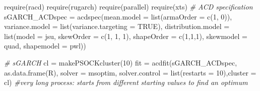 \documentclass[a4paper, twoside]{templates/ociamthesis}
\newenvironment{Shaded}{\begin{snugshade}}{\end{snugshade}}
\newcommand{\AttributeTok}[1]{\textcolor[rgb]{0.77,0.63,0.00}{#1}}
\newcommand{\CommentTok}[1]{\textcolor[rgb]{0.56,0.35,0.01}{\textit{#1}}}
\newcommand{\ConstantTok}[1]{\textcolor[rgb]{0.00,0.00,0.00}{#1}}
\newcommand{\DecValTok}[1]{\textcolor[rgb]{0.00,0.00,0.81}{#1}}
\newcommand{\FunctionTok}[1]{\textcolor[rgb]{0.00,0.00,0.00}{#1}}
\newcommand{\NormalTok}[1]{#1}
\newcommand{\OtherTok}[1]{\textcolor[rgb]{0.56,0.35,0.01}{#1}}
\newcommand{\StringTok}[1]{\textcolor[rgb]{0.31,0.60,0.02}{#1}}
\renewenvironment{Shaded}
{
  \vspace{10pt}%
  \begin{snugshade}%
}{%
  \end{snugshade}%
  \vspace{8pt}%
}
\begin{document}
\begin{Shaded}
\begin{Highlighting}[]
\FunctionTok{require}\NormalTok{(racd)}
\FunctionTok{require}\NormalTok{(rugarch)}
\FunctionTok{require}\NormalTok{(parallel)}
\FunctionTok{require}\NormalTok{(xts)}
\CommentTok{\# ACD specification}
\NormalTok{sGARCH\_ACDspec }\OtherTok{=} \FunctionTok{acdspec}\NormalTok{(}\AttributeTok{mean.model =} \FunctionTok{list}\NormalTok{(}\AttributeTok{armaOrder =} \FunctionTok{c}\NormalTok{(}\DecValTok{1}\NormalTok{, }\DecValTok{0}\NormalTok{)), }\AttributeTok{variance.model =} \FunctionTok{list}\NormalTok{(}\AttributeTok{variance.targeting =} \ConstantTok{TRUE}\NormalTok{),}
\AttributeTok{distribution.model =} \FunctionTok{list}\NormalTok{(}\AttributeTok{model =} \StringTok{\textquotesingle{}jsu\textquotesingle{}}\NormalTok{, }\AttributeTok{skewOrder =} \FunctionTok{c}\NormalTok{(}\DecValTok{1}\NormalTok{, }\DecValTok{1}\NormalTok{, }\DecValTok{1}\NormalTok{), }\AttributeTok{shapeOrder =} \FunctionTok{c}\NormalTok{(}\DecValTok{1}\NormalTok{,}\DecValTok{1}\NormalTok{,}\DecValTok{1}\NormalTok{), }\AttributeTok{skewmodel =} \StringTok{\textquotesingle{}quad\textquotesingle{}}\NormalTok{, }\AttributeTok{shapemodel =} \StringTok{\textquotesingle{}pwl\textquotesingle{}}\NormalTok{))}

\CommentTok{\# sGARCH}
\NormalTok{cl }\OtherTok{=} \FunctionTok{makePSOCKcluster}\NormalTok{(}\DecValTok{10}\NormalTok{)}
\NormalTok{fit }\OtherTok{=} \FunctionTok{acdfit}\NormalTok{(sGARCH\_ACDspec, }\FunctionTok{as.data.frame}\NormalTok{(R), }\AttributeTok{solver =} \StringTok{\textquotesingle{}msoptim\textquotesingle{}}\NormalTok{, }\AttributeTok{solver.control =} \FunctionTok{list}\NormalTok{(}\AttributeTok{restarts =} \DecValTok{10}\NormalTok{),}\AttributeTok{cluster =}\NormalTok{ cl) }\CommentTok{\#very long process: starts from different starting values to find an optimum}
\end{Highlighting}
\end{Shaded}
\end{document}
